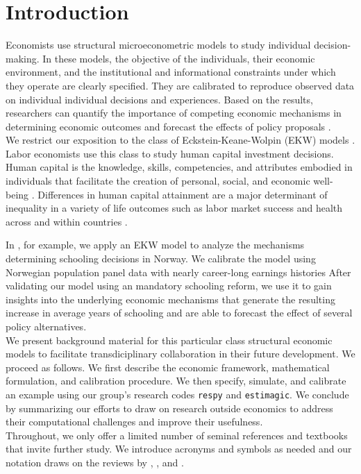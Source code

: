 \section{Introduction}
\noindent Economists use structural microeconometric models to study individual decision-making. In these models, the objective of the individuals, their economic environment, and the institutional and informational constraints under which they operate are clearly specified. They are calibrated to reproduce observed data on individual individual decisions and experiences. Based on the results, researchers can quantify the importance of competing economic mechanisms in determining economic outcomes and forecast the effects of policy proposals \citep{Wolpin.2013}.\\

\noindent We restrict our exposition to the class of Eckstein-Keane-Wolpin (EKW) models \citep{Adda.2017, Blundell.2016, Keane.1997}. Labor economists use this class to study human capital investment decisions. Human capital is the knowledge, skills, competencies, and attributes embodied in individuals that facilitate the creation of personal, social, and economic well-being \citep{Becker.1964}. Differences in human capital attainment are a major determinant of inequality in a variety of life outcomes such as labor market success and health across and within countries \citep{OECD.2001}.

In \citet{Bhuller.2018}, for example, we apply an EKW model to analyze the mechanisms determining schooling decisions in Norway. We calibrate the model using Norwegian population panel data with nearly career-long earnings histories  After validating our model using an mandatory schooling reform, we use it to gain insights into the underlying economic mechanisms that generate the resulting increase in average years of schooling and are able to forecast the effect of several policy alternatives.\\

\noindent We present background material for this particular class structural economic models to facilitate transdiciplinary collaboration in their future development. We proceed as follows. We first describe the economic framework, mathematical formulation, and calibration procedure. We then specify, simulate, and calibrate an example using our group's research codes \verb+respy+ and \verb+estimagic+. We conclude by summarizing our efforts to draw on research outside economics to address their computational challenges and improve their usefulness.\\

\noindent Throughout, we only offer a limited number of seminal references and textbooks that invite further study. We introduce acronyms and symbols as needed and our notation draws on the reviews by \cite{Aguirregabiria.2010}, \cite{Arcidiacono.2011}, and \cite{Puterman.1994}.
